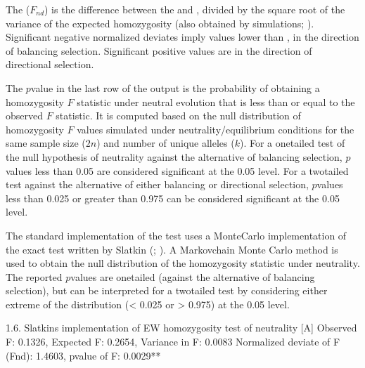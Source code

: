 \documentclass[letterpaper,10pt,english,openany,oneside]{sphinxmanual}
\begin{document}
\sphinxAtStartPar
The  (\(F_{nd}\)) is the
difference between the  and , divided by the square root of the variance of the
expected homozygosity (also obtained by simulations; ).
Significant negative normalized deviates imply 
values lower than , in the direction of balancing
selection. Significant positive values are in the direction of
directional selection.

\sphinxAtStartPar
The \(p\)\sphinxhyphen{}value in the last row of the output is the probability of
obtaining a homozygosity \(F\) statistic under neutral evolution that is
less than or equal to the observed \(F\) statistic. It is computed based
on the null distribution of homozygosity \(F\) values simulated under
neutrality/equilibrium conditions for the same sample size (\(2n\)) and
number of unique alleles (\(k\)). For a one\sphinxhyphen{}tailed test of the null
hypothesis of neutrality against the alternative of balancing selection,
\(p\)\sphinxhyphen{}values less than 0.05 are considered significant at the 0.05
level. For a two\sphinxhyphen{}tailed test against the alternative of either balancing
or directional selection, \(p\)\sphinxhyphen{}values less than 0.025 or greater than
0.975 can be considered significant at the 0.05 level.

\sphinxAtStartPar
The standard implementation of the test uses a Monte\sphinxhyphen{}Carlo
implementation of the exact test written by Slatkin (;
). A Markov\sphinxhyphen{}chain Monte Carlo method is used to obtain the
null distribution of the homozygosity statistic under neutrality. The
reported \(p\)\sphinxhyphen{}values are one\sphinxhyphen{}tailed (against the alternative of
balancing selection), but can be interpreted for a two\sphinxhyphen{}tailed test by
considering either extreme of the distribution (\textless{} 0.025 or \textgreater{} 0.975) at
the 0.05 level.

\begin{sphinxVerbatim}[commandchars=\\\{\}]
1.6. Slatkin\PYGZsq{}s implementation of EW homozygosity test of neutrality [A]
\PYGZhy{}\PYGZhy{}\PYGZhy{}\PYGZhy{}\PYGZhy{}\PYGZhy{}\PYGZhy{}\PYGZhy{}\PYGZhy{}\PYGZhy{}\PYGZhy{}\PYGZhy{}\PYGZhy{}\PYGZhy{}\PYGZhy{}\PYGZhy{}\PYGZhy{}\PYGZhy{}\PYGZhy{}\PYGZhy{}\PYGZhy{}\PYGZhy{}\PYGZhy{}\PYGZhy{}\PYGZhy{}\PYGZhy{}\PYGZhy{}\PYGZhy{}\PYGZhy{}\PYGZhy{}\PYGZhy{}\PYGZhy{}\PYGZhy{}\PYGZhy{}\PYGZhy{}\PYGZhy{}\PYGZhy{}\PYGZhy{}\PYGZhy{}\PYGZhy{}\PYGZhy{}\PYGZhy{}\PYGZhy{}\PYGZhy{}\PYGZhy{}\PYGZhy{}\PYGZhy{}\PYGZhy{}\PYGZhy{}\PYGZhy{}\PYGZhy{}\PYGZhy{}\PYGZhy{}\PYGZhy{}\PYGZhy{}\PYGZhy{}\PYGZhy{}\PYGZhy{}\PYGZhy{}\PYGZhy{}\PYGZhy{}\PYGZhy{}\PYGZhy{}\PYGZhy{}\PYGZhy{}\PYGZhy{}\PYGZhy{}\PYGZhy{}\PYGZhy{}\PYGZhy{}\PYGZhy{}
Observed F: 0.1326, Expected F: 0.2654, Variance in F: 0.0083
Normalized deviate of F (Fnd): \PYGZhy{}1.4603, p\PYGZhy{}value of F: 0.0029**
\end{sphinxVerbatim}
\end{document}

